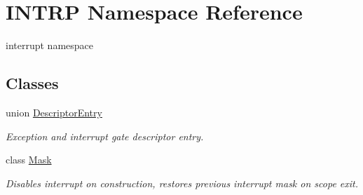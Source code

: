 \hypertarget{namespace_i_n_t_r_p}{}\section{I\+N\+T\+RP Namespace Reference}
\label{namespace_i_n_t_r_p}


interrupt namespace  


\subsection*{Classes}
\begin{DoxyCompactItemize}
\item 
union \hyperlink{union_i_n_t_r_p_1_1_descriptor_entry}{Descriptor\+Entry}
\begin{DoxyCompactList}\small\item\em Exception and interrupt gate descriptor entry. \end{DoxyCompactList}\item 
class \hyperlink{class_i_n_t_r_p_1_1_mask}{Mask}
\begin{DoxyCompactList}\small\item\em Disables interrupt on construction, restores previous interrupt mask on scope exit. \end{DoxyCompactList}\end{DoxyCompactItemize}
